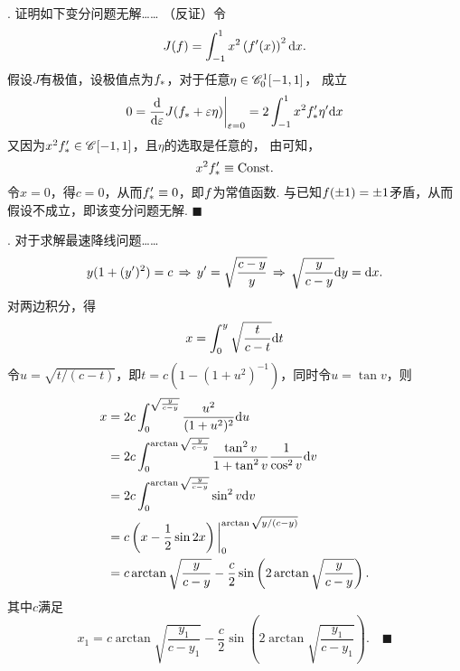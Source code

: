 \vspace{1cm}
\par{}. 证明如下变分问题无解……
\proof
  （反证）令
  \[
    J(\mathnormal{f}) = \int_{-1}^{1}x^2\left( \mathnormal{f}^{\prime}(x)\right)^2\mathrm{d} x.
  \]
  假设$J$有极值，设极值点为$\mathnormal{f}_*$，对于任意$\eta\in\mathscr{C}_0^1[-1,1]$，
  成立
  \[\begin{split}
    0 = \frac{\mathrm{d}}{\mathrm{d} \varepsilon}J(\mathnormal{f}_*+\varepsilon\eta)\bigg|_{\varepsilon=0} = 2\int_{-1}^1 x^2\mathnormal{f}_*^{\prime}\eta^{\prime}\mathrm{d} x
  \end{split}\]
  又因为$x^2\mathnormal{f}_*^{\prime}\in\mathscr{C}[-1, 1]$，且$\eta$的选取是任意的，
  由可知，
  \[
    x^2\mathnormal{f}_*^{\prime} \equiv \text{Const}.
  \]
  令$x=0$，得$c = 0$，从而$\mathnormal{f}_*^{\prime}\equiv 0$，即$\mathnormal{f}$为常值函数.
  与已知$\mathnormal{f}(\pm 1) = \pm 1$矛盾，从而假设不成立，即该变分问题无解.
  $\blacksquare$


\vspace{1cm}
\par{}. 对于求解最速降线问题……
\ans
  \[
    y(1+(y^{\prime})^2) = c\,\Rightarrow\,
    y^{\prime} = \sqrt{\frac{c-y}{y}} \,\Rightarrow\,
    \sqrt{\frac{y}{c-y}}\mathrm{d} y = \mathrm{d} x.
  \]
  对两边积分，得
  \[\begin{split}
    x = \int_0^y \sqrt{\frac{t}{c-t}}\mathrm{d} t
  \end{split}\]
  令$u = \sqrt{t/(c-t)}$，即$t=c(1-(1+u^2)^{-1})$，同时令$u=\tan v$，则
  \[\begin{split}
    x &= 2c\int_0^{\sqrt{\frac{y}{c-y}}} \frac{u^2}{(1+u^2)^2}\mathrm{d} u \\
      &= 2c\int_0^{\arctan\sqrt{\frac{y}{c-y}}} \frac{\tan^2v}{1+\tan^2v}\frac{1}{\cos^2v}\mathrm{d} v \\
      &= 2c\int_0^{\arctan\sqrt{\frac{y}{c-y}}} \sin^2v\mathrm{d} v \\
      &= c\left( x - \frac{1}{2}\sin 2x \right)\bigg|_0^{\arctan\sqrt{y/(c-y)}}\\
      &= c\arctan\sqrt{\frac{y}{c-y}}
      - \frac{c}{2}\sin\left( 2\arctan\sqrt{\frac{y}{c-y}} \right).
  \end{split}\]
  其中$c$满足
  \[
    x_1 = c\arctan\sqrt{\frac{y_1}{c-y_1}}
    - \frac{c}{2}\sin\left( 2\arctan\sqrt{\frac{y_1}{c-y_1}} \right).\quad\blacksquare
  \]

